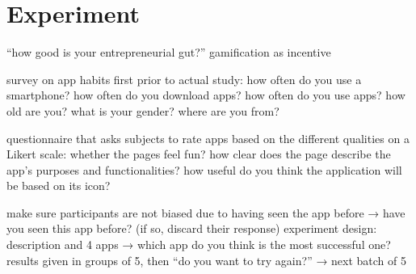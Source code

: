 \section{Experiment}


“how good is your entrepreneurial gut?” gamification as incentive

survey on app habits first prior to actual study:
how often do you use a smartphone?
how often do you download apps?
how often do you use apps?
how old are you?
what is your gender?
where are you from?

questionnaire that asks subjects to rate apps based on the different qualities on a Likert scale:
whether the pages feel fun?
how clear does the page describe the app’s purposes and functionalities?
how useful do you think the application will be based on its icon?

make sure participants are not biased due to having seen the app before → have you seen this app before? (if so, discard their response)
experiment design: description and 4 apps → which app do you think is the most successful one?
results given in groups of 5, then “do you want to try again?” → next batch of 5



